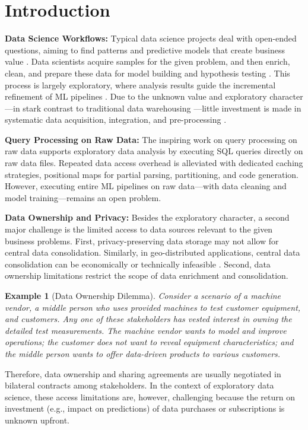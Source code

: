 \documentclass[sigconf,screen]{acmart}
\newtheorem{example}{Example}
\begin{document}
\maketitle


\section{Introduction}

\textbf{Data Science Workflows:} Typical data science projects deal with open-ended questions, aiming to find patterns and predictive models that create business value \cite{BoehmADGIKLPR20}. Data scientists acquire samples for the given problem, and then enrich, clean, and prepare these data for model building and hypothesis testing \cite{CohenDDHW09}. This process is largely exploratory, where analysis results guide the incremental refinement of ML pipelines \cite{DerakhshanMARM20,XinMMLSP18}. Due to the unknown value and exploratory character---in stark contrast to traditional data warehousing \cite{CohenDDHW09}---little investment is made in systematic data acquisition, integration, and pre-processing \cite{SculleyHGDPECYC15}.

\textbf{Query Processing on Raw Data:} The inspiring work on query processing on raw data \cite{AlagiannisBBIA12,IdreosAJA11,KarpathiotakisA16} supports exploratory data analysis by executing SQL queries directly on raw data files. Repeated data access overhead is alleviated with dedicated caching strategies, positional maps for partial parsing, partitioning, and code generation. However, executing entire ML pipelines on raw data---with data cleaning and model training---remains an open problem.

\textbf{Data Ownership and Privacy:} Besides the exploratory character, a second major challenge is the limited access to data sources relevant to the given business problems. First, privacy-preserving data storage may not allow for central data consolidation. Similarly, in geo-distributed applications, central data consolidation can be economically or technically infeasible \cite{VulimiriCGKV15}. Second, data ownership limitations restrict the scope of data enrichment and consolidation. 
\begin{example}[Data Ownership Dilemma]
Consider a scenario of a machine vendor, a middle person who uses provided machines to test customer equipment, and customers. Any one of these stakeholders has vested interest in owning the detailed test measurements. The machine vendor wants to model and improve operations; the customer does not want to reveal equipment characteristics; and the middle person wants to offer data-driven products to various customers. 
\end{example}
\noindent Therefore, data ownership and sharing agreements are usually negotiated in bilateral contracts among stakeholders. In the context of exploratory data science, these access limitations are, however, challenging because the return on investment (e.g., impact on predictions) of data purchases or subscriptions is unknown upfront.
\end{document}
